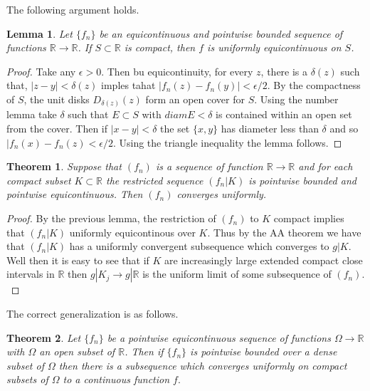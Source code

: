 \documentclass[letter]{article}
\newtheorem{theorem}{Theorem}
\newtheorem{lemma}{Lemma}
\newenvironment{menumerate}{%
  \edef\backupindent{\the\parindent}%
  \enumerate%
  \setlength{\parindent}{\backupindent}%
}{\endenumerate}
\begin{document}
\begin{menumerate}
	\setcounter{enumi}{12}
	\item The following argument holds.
	\begin{lemma}
 Let $\{f_n\}$ be an equicontinuous and pointwise bounded sequence of
functions $\mathbb{R} \to \mathbb{R}$. If $S \subset \mathbb{R}$ is compact, then $f$ is uniformly equicontinuous
on $S$.
	\end{lemma}
	\begin{proof}
		Take any $\epsilon > 0.$ Then bu equicontinuity, for every $z$, there is a $\delta(z)$ such that,
		$|z-y| < \delta(z)$ imples tahat $|f_n(z)-f_n(y)| < \epsilon/2.$ By the compactness of $S$, the unit disks
		$D_{\delta(z)}(z)$ form an open cover for $S$. Using the number lemma take $\delta$ such that $E \subset S$
		with $diam E < \delta$ is contained within an open set from the cover. Then if $|x-y| < \delta$ the set
		$\{x,y\}$ has diameter less than $\delta$ and so $|f_n(x) - f_n(z) < \epsilon/2$. Using the triangle inequality
		the lemma follows.
	\end{proof}


	\begin{theorem}
		Suppose that $(f_n)$ is a sequence of function $\mathbb{R} \to \mathbb{R}$ and for each compact subset $K\subset \mathbb{R}$
		the restricted sequence $(f_n|K)$ is pointwise bounded and pointwise equicontinuous. Then $(f_n)$ converges uniformly.
	\end{theorem}
	\begin{proof}
		By the previous lemma, the restriction of $(f_n)$ to $K$ compact implies that $(f_n|K)$ uniformly equicontinous over $K.$
		Thus by the AA theorem we have that $(f_n|K)$ has a uniformly convergent subsequence which converges to $g|K.$ Well then 
		it is easy to see that if $K$ are increasingly large extended compact close intervals in $\mathbb{R}$ then $g|K_j \to g|\mathbb{R}$
		is the uniform limit of some subsequence of $(f_n).$
	\end{proof}

	\setcounter{enumi}{17}
	\item %

	The correct generalization is as follows.
	\begin{theorem}
		Let $\{f_n\}$ be a pointwise equicontinuous sequence of functions $\Omega \to \mathbb{R}$ with
		$\Omega$ an open subset of $\mathbb{R}$. Then if $\{f_n\}$ is pointwise bounded over a dense subset of $\Omega$
		then there is a subsequence which converges uniformly on compact subsets of $\Omega$ to a continuous function $f.$
	\end{theorem}


\end{menumerate}
\end{document}
